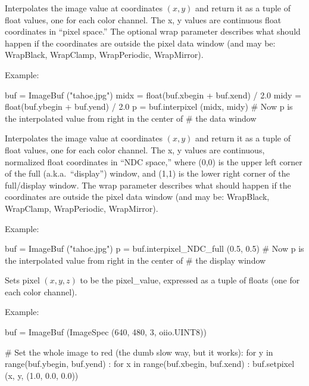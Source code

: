 Interpolates the image value at coordinates $(x,y)$ and return it as a tuple
of {\cf float} values, one for each color channel.  The {\cf x, y} values
are continuous {\cf float} coordinates in ``pixel space.''   The optional
{\cf wrap} parameter describes what should happen if the coordinates are
outside the pixel data window (and may be: {\cf WrapBlack, WrapClamp,
WrapPeriodic, WrapMirror}).

\noindent Example:
\begin{code}
    buf = ImageBuf ("tahoe.jpg")
    midx = float(buf.xbegin + buf.xend) / 2.0
    midy = float(buf.ybegin + buf.yend) / 2.0
    p = buf.interpixel (midx, midy)
    # Now p is the interpolated value from right in the center of
    # the data window
\end{code}
\apiend


Interpolates the image value at coordinates $(x,y)$ and return it as a tuple
of {\cf float} values, one for each color channel.  The {\cf x, y} values
are continuous, normalized {\cf float} coordinates in ``NDC space,'' where
{\cf (0,0)} is the upper left corner of the full (a.k.a.\ ``display'')
window, and {\cf (1,1)} is the lower right corner of the full/display
window. The  {\cf wrap} parameter describes what should happen if the
coordinates are outside the pixel data window (and may be: {\cf WrapBlack,
WrapClamp, WrapPeriodic, WrapMirror}).

\noindent Example:
\begin{code}
    buf = ImageBuf ("tahoe.jpg")
    p = buf.interpixel_NDC_full (0.5, 0.5)
    # Now p is the interpolated value from right in the center of
    # the display window
\end{code}
\apiend

Sets pixel $(x,y,z)$ to be the {\cf pixel_value}, expressed as a tuple of
{\cf float}s (one for each color channel).

\noindent Example:
\begin{code}
    buf = ImageBuf (ImageSpec (640, 480, 3, oiio.UINT8))

    # Set the whole image to red (the dumb slow way, but it works):
    for y in range(buf.ybegin, buf.yend) :
        for x in range(buf.xbegin, buf.xend) :
            buf.setpixel (x, y, (1.0, 0.0, 0.0))
\end{code}
\apiend

